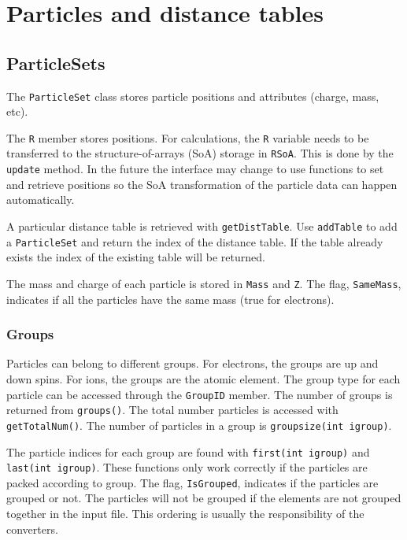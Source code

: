 \section{Particles and distance tables}
\label{sec:distance_tables}

\subsection{ParticleSets}
The \texttt{ParticleSet} class stores particle positions and attributes (charge, mass, etc).

The \texttt{R} member stores positions.
For calculations, the \texttt{R} variable needs to be transferred to the structure-of-arrays (SoA) storage in \texttt{RSoA}.   This is done by the \texttt{update} method.
In the future the interface may change to use functions to set and retrieve positions
so the SoA transformation of the particle data can happen automatically.

A particular distance table is retrieved with \texttt{getDistTable}.
Use \texttt{addTable} to add a \texttt{ParticleSet} and return the index of the distance table.
If the table already exists the index of the existing table will be returned.

The mass and charge of each particle is stored in \texttt{Mass} and \texttt{Z}.
The flag, \texttt{SameMass}, indicates if all the particles have the same mass (true for electrons).

\subsubsection{Groups}

Particles can belong to different groups.
For electrons, the groups are up and down spins.
For ions, the groups are the atomic element.
The group type for each particle can be accessed through the \texttt{GroupID} member.
The number of groups is returned from \texttt{groups()}.
The total number particles is accessed with \texttt{getTotalNum()}.
The number of particles in a group is \texttt{groupsize(int igroup)}.

The particle indices for each group are found with \texttt{first(int igroup)} and \texttt{last(int igroup)}.
These functions only work correctly if the particles are packed according to group.
The flag, \texttt{IsGrouped}, indicates if the particles are grouped or not.
The particles will not be grouped if the elements are not grouped together in the input file.
This ordering is usually the responsibility of the converters.

